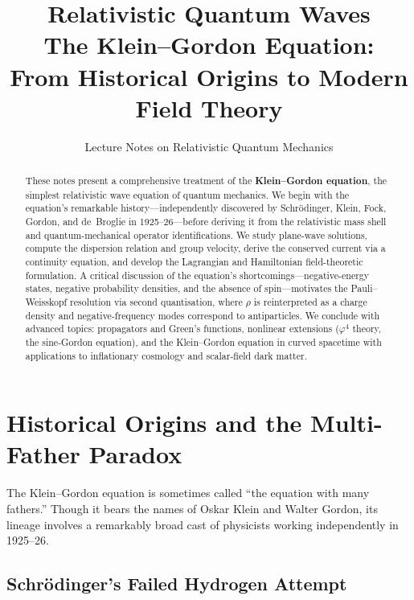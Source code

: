 \documentclass[12pt, a4paper]{article}
\title{
    \vspace{-1cm}
    \textbf{Relativistic Quantum Waves} \\[6pt]
    \Large The Klein--Gordon Equation: \\
    From Historical Origins to Modern Field Theory
}
\author{Lecture Notes on Relativistic Quantum Mechanics}
\date{}
\theoremstyle{definition}
\begin{document}
\maketitle
\thispagestyle{fancy}

\begin{abstract}
\noindent
These notes present a comprehensive treatment of the \textbf{Klein--Gordon equation}, the simplest relativistic wave equation of quantum mechanics.
We begin with the equation's remarkable history---independently discovered by Schr\"{o}dinger, Klein, Fock, Gordon, and de~Broglie in 1925--26---before deriving it from the relativistic mass shell and quantum-mechanical operator identifications.
We study plane-wave solutions, compute the dispersion relation and group velocity, derive the conserved current via a continuity equation, and develop the Lagrangian and Hamiltonian field-theoretic formulation.
A critical discussion of the equation's shortcomings---negative-energy states, negative probability densities, and the absence of spin---motivates the Pauli--Weisskopf resolution via second quantisation, where $\rho$ is reinterpreted as a charge density and negative-frequency modes correspond to antiparticles.
We conclude with advanced topics: propagators and Green's functions, nonlinear extensions ($\varphi^{4}$ theory, the sine-Gordon equation), and the Klein--Gordon equation in curved spacetime with applications to inflationary cosmology and scalar-field dark matter.
\end{abstract}

\tableofcontents
\newpage

\section{Historical Origins and the Multi-Father Paradox}
\label{sec:history}

The Klein--Gordon equation is sometimes called ``the equation with many fathers.''  Though it bears the names of Oskar Klein and Walter Gordon, its lineage involves a remarkably broad cast of physicists working independently in 1925--26.

\subsection{Schr\"{o}dinger's Failed Hydrogen Attempt}
\end{document}
